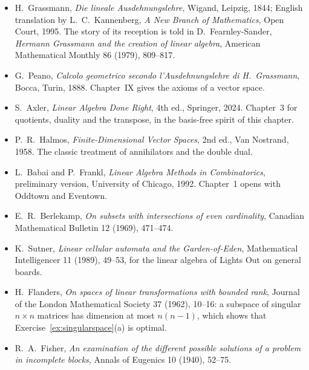 \begin{itemize}
\item H.~Grassmann, \emph{Die lineale Ausdehnungslehre}, Wigand, Leipzig, 1844; English translation by L.~C.~Kannenberg,
\emph{A New Branch of Mathematics}, Open Court, 1995. The story of its reception is told in D.~Fearnley-Sander,
\emph{Hermann Grassmann and the creation of linear algebra}, American Mathematical Monthly 86 (1979), 809--817.
\item G.~Peano, \emph{Calcolo geometrico secondo l'Ausdehnungslehre di H.~Grassmann}, Bocca, Turin, 1888. Chapter~IX gives
the axioms of a vector space.
\item S.~Axler, \emph{Linear Algebra Done Right}, 4th ed., Springer, 2024. Chapter~3 for quotients, duality and the
transpose, in the basis-free spirit of this chapter.
\item P.~R.~Halmos, \emph{Finite-Dimensional Vector Spaces}, 2nd ed., Van Nostrand, 1958. The classic treatment of
annihilators and the double dual.
\item L.~Babai and P.~Frankl, \emph{Linear Algebra Methods in Combinatorics}, preliminary version, University of Chicago,
1992. Chapter~1 opens with Oddtown and Eventown.
\item E.~R.~Berlekamp, \emph{On subsets with intersections of even cardinality}, Canadian Mathematical Bulletin 12 (1969),
471--474.
\item K.~Sutner, \emph{Linear cellular automata and the Garden-of-Eden}, Mathematical Intelligencer 11 (1989), 49--53, for
the linear algebra of Lights Out on general boards.
\item H.~Flanders, \emph{On spaces of linear transformations with bounded rank}, Journal of the London Mathematical Society
37 (1962), 10--16: a subspace of singular $n\times n$ matrices has dimension at most $n(n-1)$, which shows that
Exercise~\ref{ex:singularspace}(a) is optimal.
\item R.~A.~Fisher, \emph{An examination of the different possible solutions of a problem in incomplete blocks}, Annals of
Eugenics 10 (1940), 52--75.
\end{itemize}
